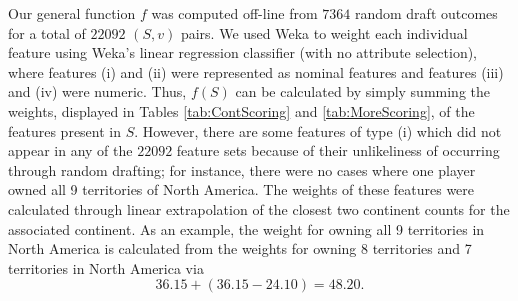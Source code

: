 \documentclass[letterpaper]{article}
\numberwithin{equation}{section}
\numberwithin{theorem}{section}
\numberwithin{lemma}{section}
\numberwithin{df}{section}
\begin{document}
Our general function $f$ was computed off-line from $7364$ random draft outcomes for a total of $22092$ $(S,v)$ pairs.  We used Weka \cite{Weka} to weight each individual feature using Weka's linear regression classifier (with no attribute selection), where features (i) and (ii) were represented as nominal features and features (iii) and (iv) were numeric.  Thus, $f(S)$ can be calculated by simply summing the weights, displayed in Tables \ref{tab:ContScoring} and \ref{tab:MoreScoring}, of the features present in $S$.  However, there are some features of type (i) which did not appear in any of the $22092$ feature sets because of their unlikeliness of occurring through random drafting; for instance, there were no cases where one player owned all 9 territories of North America.  The weights of these features were calculated through linear extrapolation of the closest two continent counts for the associated continent.  As an example, the weight for owning all 9 territories in North America is calculated from the weights for owning 8 territories and 7 territories in North America via
\[ 36.15 + (36.15 - 24.10) = 48.20. \]  

\end{document}
